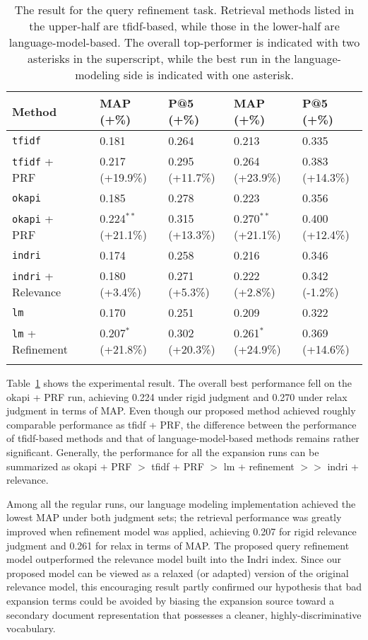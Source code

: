 \begin{table}[ht!]
  \centering
  \begin{tabular}{llllll}
    Method & & MAP (+\%) & P@5 (+\%) & MAP (+\%) & P@5 (+\%) \\
    \hline
    {\tt tfidf} & & 0.181 & 0.264 & 0.213 & 0.335 \\
    {\tt tfidf} + PRF & & 0.217 (+19.9\%) & 0.295 (+11.7\%) & 0.264 (+23.9\%) & 0.383 (+14.3\%) \\
    {\tt okapi} & & 0.185 & 0.278 & 0.223 & 0.356 \\
    {\tt okapi} + PRF & & 0.224$^{**}$ (+21.1\%) & 0.315 (+13.3\%) & 0.270$^{**}$ (+21.1\%) & 0.400 (+12.4\%) \\
    \hline
    {\tt indri} & & 0.174 & 0.258 & 0.216 & 0.346 \\
    {\tt indri} + Relevance & & 0.180 (+3.4\%) & 0.271 (+5.3\%) & 0.222 (+2.8\%) & 0.342 (-1.2\%) \\
    {\tt lm} & & 0.170 & 0.251 & 0.209 & 0.322 \\
    {\tt lm} + Refinement & & 0.207$^*$ (+21.8\%) & 0.302 (+20.3\%) & 0.261$^*$ (+24.9\%) & 0.369 (+14.6\%) \\
    \\
  \end{tabular}

  \caption{The result for the query refinement task.  Retrieval methods listed in the
  upper-half are tfidf-based, while those in the lower-half are
  language-model-based.  The overall top-performer is indicated with two
  asterisks in the superscript, while the best run in the language-modeling
  side is indicated with one asterisk.}
  \label{t:query-modeling}
\end{table}

Table~\ref{t:query-modeling} shows the experimental result.  The overall best
performance fell on the okapi + PRF run, achieving 0.224 under rigid judgment
and 0.270 under relax judgment in terms of MAP.  Even though our proposed
method achieved roughly comparable performance as tfidf + PRF, the difference
between the performance of tfidf-based methods and that of language-model-based
methods remains rather significant.  Generally, the performance for all the
expansion runs can be summarized as okapi + PRF $>$ tfidf + PRF $>$ lm + refinement
$>>$ indri + relevance.

Among all the regular runs, our language modeling implementation achieved the
lowest MAP under both judgment sets; the retrieval performance was greatly
improved when refinement model was applied, achieving 0.207 for rigid relevance
judgment and 0.261 for relax in terms of MAP.  The proposed query refinement
model outperformed the relevance model built into the Indri index.  Since our
proposed model can be viewed as a relaxed (or adapted) version of the original
relevance model, this encouraging result partly confirmed our hypothesis that
bad expansion terms could be avoided by biasing the expansion source toward a
secondary document representation that possesses a cleaner,
highly-discriminative vocabulary.  

